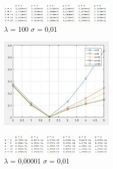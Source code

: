 \begin{figure}[h]
	\centering
	\includegraphics[width=0.5\textwidth]{tl100s01.png}
	\caption{$\lambda$ = 100 $\sigma$ = 0,01}
	\label{fig:lambda = 100 sigma = 0,01}
\end{figure}

\begin{figure}[h]
	\centering
	\includegraphics[width=0.5\textwidth]{pl000001s001.png}
\end{figure}

\begin{figure}[h]
	\centering
	\includegraphics[width=0.5\textwidth]{tl000001s001.png}
	\caption{$\lambda$ = 0,00001 $\sigma$ = 0,01}
	\label{fig:lambda = 0,00001 sigma = 0,01}
\end{figure}